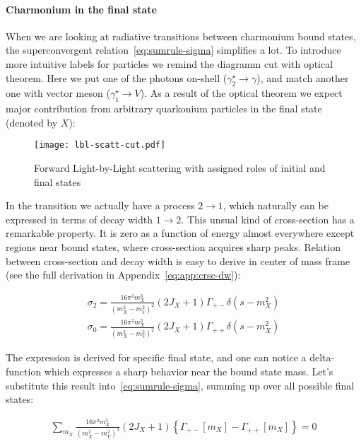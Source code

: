 \paragraph{Charmonium in the final state}
When we are looking at radiative transitions between charmonium bound states, the superconvergent relation~\cref{eq:sumrule-sigma} simplifies a lot. To introduce more intuitive labels for particles we remind the diagramm cut with optical theorem. Here we put one of the photons on-shell ($\gamma_2^\star \rightarrow \gamma$), and match another one with vector meson ($\gamma_1^\star \rightarrow V$). As a result of the optical theorem we expect major contribution from arbitrary quarkonium particles in the final state (denoted by $X$):

\begin{figure}
    \centering
    \texttt{[image: lbl-scatt-cut.pdf]}
    \caption{Forward Light-by-Light scattering with assigned roles of initial and final states \label{fig:lbl-scatt-cut}}
\end{figure}

In the transition we actually have a process $2 \rightarrow 1$, which naturally can be expressed in terms of decay width $1 \rightarrow 2$. This unsual kind of cross-section has a remarkable property. It is zero as a function of energy almost everywhere except regions near bound states, where cross-section acquires sharp peaks. Relation between cross-section and decay width is easy to derive in center of mass frame (see the full derivation in Appendix~\cref{eq:app:crsc-dw}):

\begin{align} \label{eq:crsc-dw}
    \sigma_{2} = \frac{16 \pi^2 m_X^3}{(m_X^2 - m_V^2)^2} (2J_X + 1) \Gamma_{+-} \delta(s - m_X^2) \\
    \sigma_{0} = \frac{16 \pi^2 m_X^3}{(m_X^2 - m_V^2)^2} (2J_X + 1) \Gamma_{++} \delta(s - m_X^2)
\end{align}

The expression is derived for specific final state, and one can notice a delta-function which expresses a sharp behavior near the bound state mass. Let's substitute this result into~\cref{eq:sumrule-sigma}, summing up over all possible final states:

\begin{align}
    \sum_{m_X} \frac{16 \pi^2 m_X^3}{(m_X^2 - m_V^2)^3} (2J_X+1) \left\{ \Gamma_{+-}[m_X] - \Gamma_{++}[m_X] \right\} = 0
\end{align}

